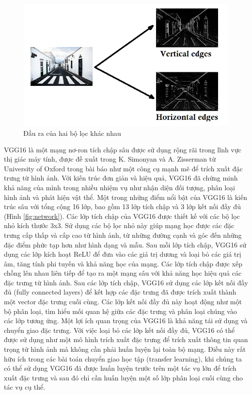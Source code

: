 \documentclass[a4paper]{article}
\begin{document}
\begin{figure}[h]
	\centering
	\includegraphics[width=0.7\linewidth]{fig/edges}
	\caption{Đầu ra của hai bộ lọc khác nhau}
	\label{fig:edges}
\end{figure}

VGG16 là một mạng nơ-ron tích chập sâu được sử dụng rộng rãi trong lĩnh vực thị giác máy tính, được đề xuất trong K. Simonyan và A. Zisserman từ University of Oxford trong bài báo \cite{vgg} như một công cụ mạnh mẽ để trích xuất đặc trưng từ hình ảnh. Với kiến trúc đơn giản và hiệu quả, VGG16 đã chứng minh khả năng của mình trong nhiều nhiệm vụ như nhận diện đối tượng, phân loại hình ảnh và phát hiện vật thể. Một trong những điểm nổi bật của VGG16 là kiến trúc sâu với tổng cộng 16 lớp, bao gồm 13 lớp tích chập và 3 lớp kết nối đầy đủ (Hình \ref{fig:network}). Các lớp tích chập của VGG16 được thiết kế với các bộ lọc nhỏ kích thước 3x3. Sử dụng các bộ lọc nhỏ này giúp mạng học được các đặc trưng cấp thấp và cấp cao từ hình ảnh, từ những đường cạnh và góc đến những đặc điểm phức tạp hơn như hình dạng và mẫu. Sau mỗi lớp tích chập, VGG16 sử dụng các lớp kích hoạt ReLU để đưa vào các giá trị dương và loại bỏ các giá trị âm, tăng tính phi tuyến và khả năng học của mạng. Các lớp tích chập được xếp chồng lên nhau liên tiếp để tạo ra một mạng sâu với khả năng học hiệu quả các đặc trưng từ hình ảnh. Sau các lớp tích chập, VGG16 sử dụng các lớp kết nối đầy đủ (fully connected layers) để kết hợp các đặc trưng đã được trích xuất thành một vector đặc trưng cuối cùng. Các lớp kết nối đầy đủ này hoạt động như một bộ phân loại, tìm hiểu mối quan hệ giữa các đặc trưng và phân loại chúng vào các lớp tương ứng. Một lợi ích quan trọng của VGG16 là khả năng tái sử dụng và chuyển giao đặc trưng. Với việc loại bỏ các lớp kết nối đầy đủ, VGG16 có thể được sử dụng như một mô hình trích xuất đặc trưng để trích xuất thông tin quan trọng từ hình ảnh mà không cần phải huấn luyện lại toàn bộ mạng. Điều này rất hữu ích trong các bài toán chuyển giao học tập (transfer learning), khi chúng ta có thể sử dụng VGG16 đã được huấn luyện trước trên một tác vụ lớn để trích xuất đặc trưng và sau đó chỉ cần huấn luyện một số lớp phân loại cuối cùng cho tác vụ cụ thể.
\end{document}
